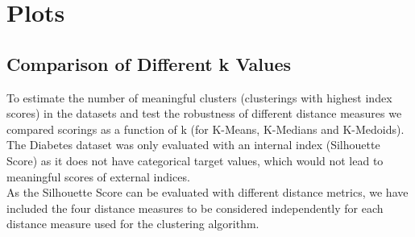 \section{Plots}

\subsection{Comparison of Different k Values}
To estimate the number of meaningful clusters (clusterings with highest index scores) in the datasets and test the robustness of different distance measures we compared scorings as a function of k (for K-Means, K-Medians and K-Medoids). The Diabetes dataset was only evaluated with an internal index (Silhouette Score) as it does not have categorical target values, which would not lead to meaningful scores of external indices.  \\
As the Silhouette Score can be evaluated with different distance metrics, we have included the four distance measures to be considered independently for each distance measure used for the clustering algorithm. 

